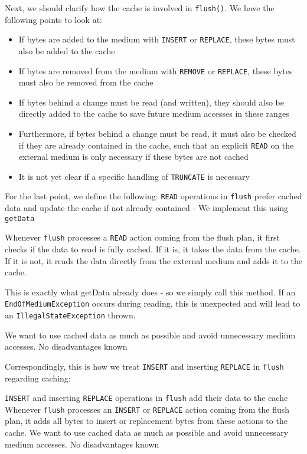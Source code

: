 Next, we should clarify how the cache is involved in \texttt{flush()}. We have the following points to look at:
\begin{itemize}
\item If bytes are added to the medium with \texttt{INSERT} or \texttt{REPLACE}, these bytes must also be added to the cache
\item If bytes are removed from the medium with \texttt{REMOVE} or \texttt{REPLACE}, these bytes must also be removed from the cache
\item If bytes behind a change must be read (and written), they should also be directly added to the cache to save future medium accesses in these ranges
\item Furthermore, if bytes behind a change must be read, it must also be checked if they are already contained in the cache, such that an explicit \texttt{READ} on the external medium is only necessary if these bytes are not cached
\item It is not yet clear if a specific handling of \texttt{TRUNCATE} is necessary
\end{itemize}

For the last point, we define the following:
{%
\texttt{READ} operations in \texttt{flush} prefer cached data and update the cache if not already contained - We implement this using \texttt{getData}
}
{%
Whenever \texttt{flush} processes a \texttt{READ} action coming from the flush plan, it first checks if the data to read is fully cached. If it is, it takes the data from the cache. If it is not, it reads the data directly from the external medium and adds it to the cache.

This is exactly what getData already does - so we simply call this method. If an \texttt{EndOfMediumException} occurs during reading, this is unexpected and will lead to an \texttt{IllegalStateException} thrown.
}
{%
We want to use cached data as much as possible and avoid unnecessary medium accesses.
}
{%
No disadvantages known
}

Correspondingly, this is how we treat \texttt{INSERT} and inserting \texttt{REPLACE} in \texttt{flush} regarding caching:

{%
\texttt{INSERT} and inserting \texttt{REPLACE} operations in \texttt{flush} add their data to the cache
}
{%
Whenever \texttt{flush} processes an \texttt{INSERT} or \texttt{REPLACE} action coming from the flush plan, it adds all bytes to insert or replacement bytes from these actions to the cache.
}
{%
We want to use cached data as much as possible and avoid unnecessary medium accesses.
}
{%
No disadvantages known
}

